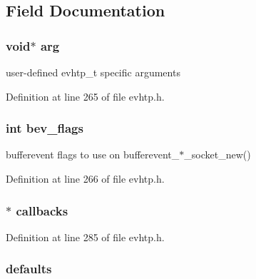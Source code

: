 \subsection{\-Field \-Documentation}
\hypertarget{structevhtp__s_a9ce2ec4812a92cb6ab39f6e81e9173a9}{
\subsubsection[{arg}]{\setlength{\rightskip}{0pt plus 5cm}void$\ast$ {\bf arg}}}\label{structevhtp__s_a9ce2ec4812a92cb6ab39f6e81e9173a9}
user-\/defined evhtp\-\_\-t specific arguments 

\-Definition at line 265 of file evhtp.\-h.

\hypertarget{structevhtp__s_a8d3f621cd735373f6657f8ea1a4d21de}{
\subsubsection[{bev\-\_\-flags}]{\setlength{\rightskip}{0pt plus 5cm}int {\bf bev\-\_\-flags}}}\label{structevhtp__s_a8d3f621cd735373f6657f8ea1a4d21de}
bufferevent flags to use on bufferevent\-\_\-$\ast$\-\_\-socket\-\_\-new() 

\-Definition at line 266 of file evhtp.\-h.

\hypertarget{structevhtp__s_a43bc08d49284feb774b73ee06cf0a769}{
\subsubsection[{callbacks}]{$\ast$ {\bf callbacks}}}\label{structevhtp__s_a43bc08d49284feb774b73ee06cf0a769}


\-Definition at line 285 of file evhtp.\-h.

\hypertarget{structevhtp__s_a5ca39f6268aea8173dbdc0a1e297925b}{
\subsubsection[{defaults}]{ {\bf defaults}}}\label{structevhtp__s_a5ca39f6268aea8173dbdc0a1e297925b}


